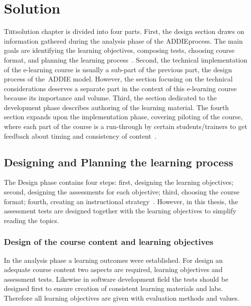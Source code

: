 \chapter{Solution}
\label{solution}
\lettrine[lraise=0.1, nindent=0em, slope=-.5em]{\color{Violet}T}{he}solution chapter is divided into four parts. First, the design section draws on information gathered during the analysis phase of the  \gls{ADDIE}process. The main goals are identifying the learning objectives, composing tests, choosing course format, and planning the learning process~\citep{website:design_phase_ADDIE}.  Second, the technical implementation of the e-learning course is usually a sub-part of the previous part, the design process of the~\gls{ADDIE}  model. However, the section focusing on the technical considerations deserves a separate part in the context of this e-learning course because its importance and  volume. Third, the section dedicated to the development phase describes authoring of the learning material. The fourth section expands upon the implementation phase, covering piloting of the course, where each part of the course is a run-through by certain students/trainers to get feedback about timing and consistency of content~\citep{website:design_phase_ADDIE}.



 
\section{Designing and Planning the learning process}
The Design phase contains four steps: first, designing the learning objectives; second, designing the assessments for each objective; third, choosing the course format; fourth, creating an instructional strategy~\citep{website:design_phase_ADDIE}.  However, in this thesis, the assessment tests are designed together with the learning objectives to simplify reading the topics.

\subsection{Design of the course content and learning objectives}

In the analysis phase a learning outcomes were established. For design an adequate course content two aspects are required, learning objectives and assessment tests. Likewise in software development field the tests should be designed first to ensure creation of consistent learning materials and labs. Therefore all learning objectives are given with evaluation methods and values.  

